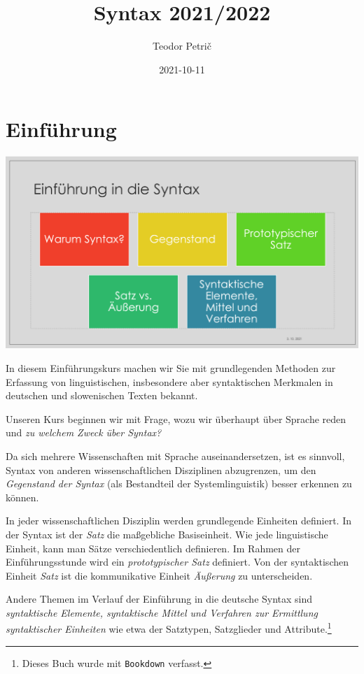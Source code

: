 \documentclass[
]{article}
\title{Syntax 2021/2022}
\author{Teodor Petrič}
\date{2021-10-11}
\begin{document}
\maketitle

{
\hypersetup{linkcolor=}
\setcounter{tocdepth}{2}
\tableofcontents
}
\hypertarget{einfuxfchrung}{%
\section{Einführung}\label{einfuxfchrung}}

\includegraphics[width=1\linewidth]{pictures/Syntax_intro_01}

In diesem Einführungskurs machen wir Sie mit grundlegenden Methoden zur
Erfassung von linguistischen, insbesondere aber syntaktischen Merkmalen
in deutschen und slowenischen Texten bekannt.

Unseren Kurs beginnen wir mit Frage, wozu wir überhaupt über Sprache
reden und \emph{zu welchem Zweck über Syntax?}

Da sich mehrere Wissenschaften mit Sprache auseinandersetzen, ist es
sinnvoll, Syntax von anderen wissenschaftlichen Disziplinen abzugrenzen,
um den \emph{Gegenstand der Syntax} (als Bestandteil der Systemlinguistik)
besser erkennen zu können.

In jeder wissenschaftlichen Disziplin werden grundlegende Einheiten
definiert. In der Syntax ist der \emph{Satz} die maßgebliche Basiseinheit.
Wie jede linguistische Einheit, kann man Sätze verschiedentlich
definieren. Im Rahmen der Einführungsstunde wird ein \emph{prototypischer
Satz} definiert. Von der syntaktischen Einheit \emph{Satz} ist die
kommunikative Einheit \emph{Äußerung} zu unterscheiden.

Andere Themen im Verlauf der Einführung in die deutsche Syntax sind
\emph{syntaktische Elemente, syntaktische Mittel und Verfahren zur Ermittlung
syntaktischer Einheiten} wie etwa der Satztypen, Satzglieder und
Attribute.\footnote{Dieses Buch wurde mit \texttt{Bookdown} \citep{xie2015} verfasst.}
\end{document}
